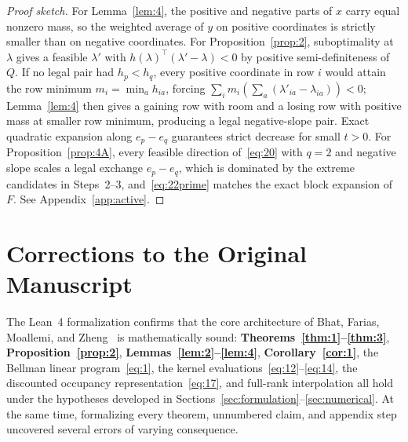 \documentclass[11pt,letterpaper]{article}
\theoremstyle{definition}
\begin{document}
\begin{proof}[Proof sketch]
For Lemma~\ref{lem:4}, the positive and negative parts of $x$ carry equal nonzero mass, so the weighted average of $y$ on positive coordinates is strictly smaller than on negative coordinates. For Proposition~\ref{prop:2}, suboptimality at $\lambda$ gives a feasible $\lambda'$ with $h(\lambda)^\top(\lambda'-\lambda) < 0$ by positive semi-definiteness of $Q$. If no legal pair had $h_p < h_q$, every positive coordinate in row $i$ would attain the row minimum $m_i = \min_a h_{ia}$, forcing $\sum_i m_i (\sum_a (\lambda'_{ia}-\lambda_{ia})) < 0$; Lemma~\ref{lem:4} then gives a gaining row with room and a losing row with positive mass at smaller row minimum, producing a legal negative-slope pair. Exact quadratic expansion along $e_p - e_q$ guarantees strict decrease for small $t > 0$. For Proposition~\ref{prop:4A}, every feasible direction of~\eqref{eq:20} with $q=2$ and negative slope scales a legal exchange $e_p - e_q$, which is dominated by the extreme candidates in Steps~2--3, and~\eqref{eq:22prime} matches the exact block expansion of $F$. See Appendix~\ref{app:active}.
\end{proof}

\section{Corrections to the Original Manuscript}
\label{sec:corrections}

The Lean~4 formalization confirms that the core architecture of Bhat, Farias, Moallemi, and Zheng~\cite{BFMZ22} is mathematically sound: \textbf{Theorems~\ref{thm:1}--\ref{thm:3}}, \textbf{Proposition~\ref{prop:2}}, \textbf{Lemmas~\ref{lem:2}--\ref{lem:4}}, \textbf{Corollary~\ref{cor:1}}, the Bellman linear program~\eqref{eq:1}, the kernel evaluations~\eqref{eq:12}--\eqref{eq:14}, the discounted occupancy representation~\eqref{eq:17}, and full-rank interpolation all hold under the hypotheses developed in Sections~\ref{sec:formulation}--\ref{sec:numerical}. At the same time, formalizing every theorem, unnumbered claim, and appendix step uncovered several errors of varying consequence.
\end{document}
